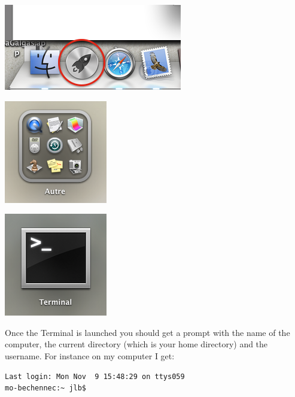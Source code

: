 \documentclass[11pt]{report}
\begin{document}
\noindent
\begin{minipage}{.5\textwidth}
\begin{center}
   \includegraphics[scale=0.6]{launcher.png}
\end{center}
\end{minipage}
\begin{minipage}{.25\textwidth}
\begin{center}
   \includegraphics[scale=0.5]{autre.png} 
\end{center}
\end{minipage}
\begin{minipage}{.25\textwidth}
\begin{center}
   \includegraphics[scale=0.5]{terminal.png} 
\end{center}
\end{minipage}

Once the Terminal is launched you should get a prompt with the name of the computer, the current directory (which is your home directory) and the username. For instance on my computer I get:

\begin{shaded*}
\vspace{-1.7mm}
\begin{verbatim}
Last login: Mon Nov  9 15:48:29 on ttys059
mo-bechennec:~ jlb$ 
\end{verbatim}
\end{shaded*}
\end{document}
